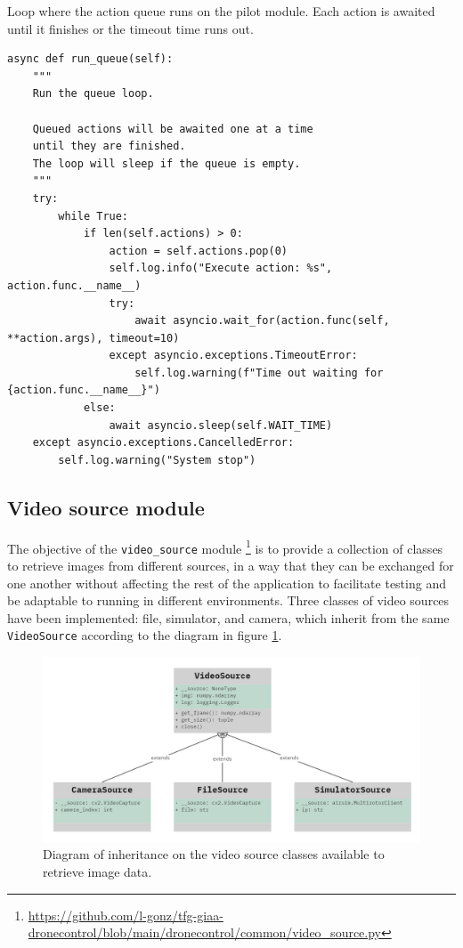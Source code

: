 \begin{listing}[!ht]
    \caption{Loop where the action queue runs on the pilot module. Each action is awaited until it finishes or the timeout time runs out.}{}
    \label{lst:pilot-queue}
    \begin{verbatim}
async def run_queue(self):
    """
    Run the queue loop.
    
    Queued actions will be awaited one at a time
    until they are finished.
    The loop will sleep if the queue is empty.
    """
    try:
        while True:
            if len(self.actions) > 0:
                action = self.actions.pop(0)
                self.log.info("Execute action: %s", action.func.__name__)
                try:
                    await asyncio.wait_for(action.func(self, **action.args), timeout=10)
                except asyncio.exceptions.TimeoutError:
                    self.log.warning(f"Time out waiting for {action.func.__name__}")
            else:
                await asyncio.sleep(self.WAIT_TIME)
    except asyncio.exceptions.CancelledError:
        self.log.warning("System stop")
    \end{verbatim}
\end{listing}


\subsection{Video source module}
\label{subsec:viz-source-module}

The objective of the \texttt{video\_source} module \footnote{\url{https://github.com/l-gonz/tfg-giaa-dronecontrol/blob/main/dronecontrol/common/video_source.py}} is to provide a collection of classes to retrieve images from different sources,
in a way that they can be exchanged for one another without affecting the rest of the application to facilitate testing and be adaptable to running in different environments.
Three classes of video sources have been implemented: file, simulator, and camera, which inherit from the same \texttt{VideoSource} according to the diagram in figure \ref{fig:video-source-inheritance}.

\begin{figure}
  \centering
  \includegraphics[width=\textwidth, keepaspectratio]{img/uml-video-source.jpg}
  \caption{Diagram of inheritance on the video source classes available to retrieve image data.}
  \label{fig:video-source-inheritance}
\end{figure}


